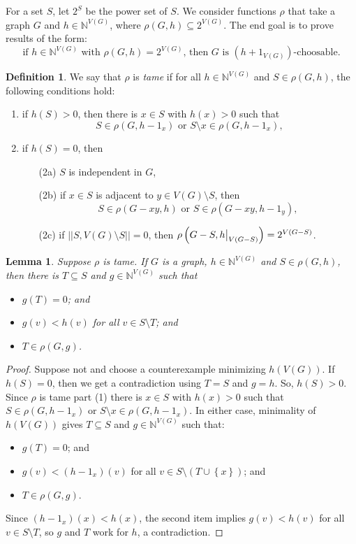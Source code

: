 \documentclass[12pt]{article}
\theoremstyle{plain}
\newtheorem{lem}[thm]{Lemma}
\theoremstyle{definition}
\newtheorem{defn}{Definition}
\theoremstyle{remark}
\newcommand{\IN}{\mathbb{N}}
\newcommand{\set}[1]{\left\{ #1 \right\}}
\newcommand{\parens}[1]{\left( #1 \right)}
\newcommand\restr[2]{{%
  \left.\kern-\nulldelimiterspace %
  #1 %
  \vphantom{\big|} %
  \right|_{#2} %
  }}
\begin{document}
For a set $S$, let $2^S$ be the power set of $S$. We consider functions $\rho$ that take a graph $G$ and $h \in \IN^{V(G)}$, where $\rho(G,h) \subseteq 2^{V(G)}$.  The end goal is to prove results of the form:
\[\text{if } h \in \IN^{V(G)} \text{ with } \rho(G, h) = 2^{V(G)}\text{, then } G \text{ is } (h + 1_{V(G)})\text{-choosable}.\]
\newpage
\begin{defn}\label{tame}
	We say that $\rho$ is \emph{tame} if for all $h \in \IN^{V(G)}$ and $S \in \rho(G, h)$, the following conditions hold:
\begin{enumerate}
	\item if $h(S) > 0$, then there is $x \in S$ with $h(x) > 0$ such that 
	 \[S \in \rho(G, h - 1_x) \text{ or } S \setminus x \in \rho(G, h - 1_x),\]

	\item if $h(S) = 0$, then
    \begin{enumerate}
    \item[(2a)] $S$ is independent in $G$,
	\item[(2b)] if $x \in S$ is adjacent to $y \in V(G) \setminus S$, then 
	\[S \in \rho(G-xy, h) \text{ or } S \in \rho(G-xy, h - 1_y),\]
	\item[(2c)] if $||S, V(G) \setminus S|| = 0$, then $\rho\parens{G - S, \restr{h}{V(G-S)}} = 2^{V(G-S)}$.
    \end{enumerate}
\end{enumerate}
\end{defn}

\begin{lem}\label{GetSuperStable}
	Suppose $\rho$ is tame. If $G$ is a graph, $h \in \IN^{V(G)}$ and $S \in \rho(G, h)$, then there is $T \subseteq S$ and $g \in \IN^{V(G)}$ such that
	\begin{itemize}
		\item $g(T) = 0$; and
		\item $g(v) < h(v)$ for all $v \in S\setminus T$; and
		\item $T \in \rho(G, g)$.
	\end{itemize}
\end{lem}
\begin{proof}
	Suppose not and choose a counterexample minimizing $h(V(G))$.  If $h(S) = 0$, then we get a contradiction using $T = S$ and $g=h$.  So, $h(S) > 0$. Since $\rho$ is tame part (1) there is $x \in S$ with $h(x) > 0$ such that $S \in \rho(G, h - 1_x)$ or $S \setminus x \in \rho(G, h - 1_x)$.  In either case, minimality of $h(V(G))$ gives $T \subseteq S$ and $g \in \IN^{V(G)}$ such that:
		\begin{itemize}
			\item $g(T) = 0$; and
			\item $g(v) < (h - 1_x)(v)$ for all $v \in S\setminus (T \cup \set{x})$; and
			\item $T \in \rho(G, g)$.
		\end{itemize}
		Since $(h - 1_x)(x) < h(x)$, the second item implies $g(v) < h(v)$ for all $v \in S\setminus T$, so $g$ and $T$ work for $h$, a contradiction.
\end{proof}
\end{document}
